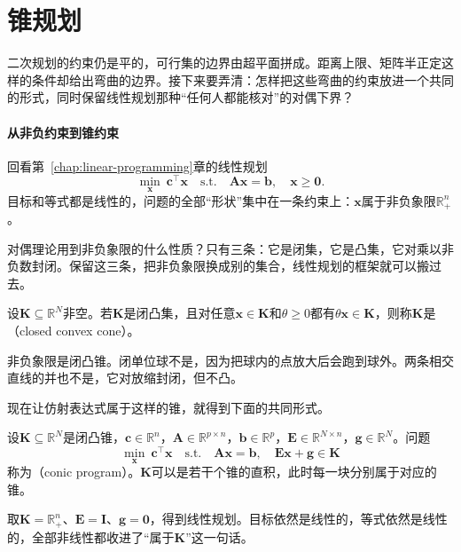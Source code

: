 \section{锥规划}
\label{sec:cone-conic}

二次规划的约束仍是平的，可行集的边界由超平面拼成。距离上限、矩阵半正定这样的条件却给出弯曲的边界。接下来要弄清：怎样把这些弯曲的约束放进一个共同的形式，同时保留线性规划那种“任何人都能核对”的对偶下界？

\paragraph{从非负约束到锥约束}
回看第~\ref{chap:linear-programming}章的线性规划
\[
 \min_{\bm{x}}\ \bm{c}^\top\bm{x}\quad\text{s.t.}\quad\bm{A}\bm{x}=\bm{b},\quad\bm{x}\geq\bm{0}.
\]
目标和等式都是线性的，问题的全部“形状”集中在一条约束上：$\bm{x}$属于非负象限$\mathbb{R}^n_+$。

对偶理论用到非负象限的什么性质？只有三条：它是闭集，它是凸集，它对乘以非负数封闭。保留这三条，把非负象限换成别的集合，线性规划的框架就可以搬过去。

\begin{definition}[闭凸锥]
\label{def:cone-closed-convex-cone}
设$\bm{K}\subseteq\mathbb{R}^N$非空。若$\bm{K}$是闭凸集，且对任意$\bm{x}\in\bm{K}$和$\theta\geq0$都有$\theta\bm{x}\in\bm{K}$，则称$\bm{K}$是（closed convex cone）。
\end{definition}

非负象限是闭凸锥。闭单位球不是，因为把球内的点放大后会跑到球外。两条相交直线的并也不是，它对放缩封闭，但不凸。

现在让仿射表达式属于这样的锥，就得到下面的共同形式。

\begin{definition}[锥规划]
\label{def:cone-conic-program}
设$\bm{K}\subseteq\mathbb{R}^N$是闭凸锥，$\bm{c}\in\mathbb{R}^n$，$\bm{A}\in\mathbb{R}^{p\times n}$，$\bm{b}\in\mathbb{R}^p$，$\bm{E}\in\mathbb{R}^{N\times n}$，$\bm{g}\in\mathbb{R}^N$。问题
\begin{equation}
 \min_{\bm{x}}\ \bm{c}^\top\bm{x}\quad\text{s.t.}\quad\bm{A}\bm{x}=\bm{b},\quad\bm{E}\bm{x}+\bm{g}\in\bm{K}
 \label{eq:cone-conic}
\end{equation}
称为（conic program）。$\bm{K}$可以是若干个锥的直积，此时每一块分别属于对应的锥。
\end{definition}

取$\bm{K}=\mathbb{R}^n_+$、$\bm{E}=\bm{I}$、$\bm{g}=\bm{0}$，得到线性规划。目标依然是线性的，等式依然是线性的，全部非线性都收进了“属于$\bm{K}$”这一句话。

